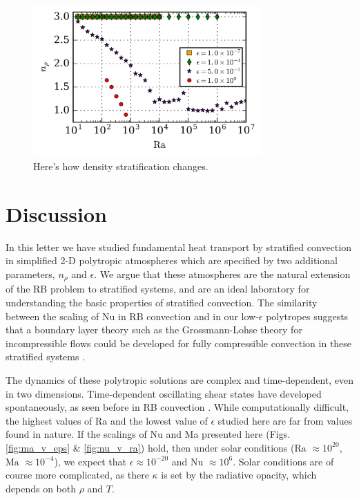 \documentclass[aps, prl, twocolumn, nofootinbib, groupedaddress, amsfonts, amssymb, amsmath]{revtex4-1}
\newcommand{\nrho}{\ensuremath{n_{\rho}}}
\begin{document}
\begin{figure}[t]
\includegraphics[width=3.4375in]{./figs/density_v_ra.png}
\caption{\label{fig:nrho_v_ra} Here's how density stratification changes.}
\end{figure}

\section{Discussion}
\label{sec:discussion}
In this letter we have studied fundamental heat transport by 
stratified convection in simplified 2-D polytropic
atmospheres which are specified by two additional parameters, $\nrho$ 
and $\epsilon$.  We argue that these atmospheres are the natural extension
of the RB problem to stratified systems, 
and are an ideal laboratory for understanding the basic properties of stratified
convection.  The similarity between the scaling of Nu in RB 
convection and in our low-$\epsilon$ polytropes suggests 
that a boundary layer theory such as the Grossmann-Lohse theory for incompressible flows
could be developed for fully compressible 
convection in these stratified systems \cite{ahlers&all2009}.  

The dynamics of these polytropic solutions are complex and time-dependent, even in two dimensions.
Time-dependent oscillating shear states have developed spontaneously, as seen before in RB convection
\cite{goluskin&all2014}.  While computationally difficult, the highest values of Ra and the lowest value
of $\epsilon$ studied here are far from values found in nature.  If the scalings of Nu and Ma
presented here (Figs. \ref{fig:ma_v_eps} \& \ref{fig:nu_v_ra}) hold, then under solar conditions ($\text{Ra }\approx 10^{20}$, $\text{Ma }\approx 10^{-4}$), we expect that $\epsilon \approx 10^{-20}$ and
$\text{Nu }\approx 10^{6}$.  
Solar conditions are of course more complicated, as there $\kappa$ is
set by the radiative opacity, which depends on both $\rho$ and $T$.
\end{document}
